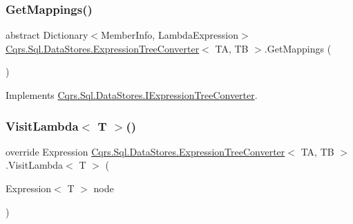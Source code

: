 \subsubsection{\texorpdfstring{Get\+Mappings()}{GetMappings()}}
{\footnotesize\ttfamily abstract Dictionary$<$Member\+Info, Lambda\+Expression$>$ \hyperlink{classCqrs_1_1Sql_1_1DataStores_1_1ExpressionTreeConverter}{Cqrs.\+Sql.\+Data\+Stores.\+Expression\+Tree\+Converter}$<$ TA, TB $>$.Get\+Mappings (\begin{DoxyParamCaption}{ }\end{DoxyParamCaption})\hspace{0.3cm}{\ttfamily [pure virtual]}}



Implements \hyperlink{interfaceCqrs_1_1Sql_1_1DataStores_1_1IExpressionTreeConverter_ad48480ecf7056a2b2cc079006cc2a589_ad48480ecf7056a2b2cc079006cc2a589}{Cqrs.\+Sql.\+Data\+Stores.\+I\+Expression\+Tree\+Converter}.

\mbox{\label{classCqrs_1_1Sql_1_1DataStores_1_1ExpressionTreeConverter_abf97079f29447cd8e0bcfab91891ccb9_abf97079f29447cd8e0bcfab91891ccb9}} 
\subsubsection{\texorpdfstring{Visit\+Lambda$<$ T $>$()}{VisitLambda< T >()}}
{\footnotesize\ttfamily override Expression \hyperlink{classCqrs_1_1Sql_1_1DataStores_1_1ExpressionTreeConverter}{Cqrs.\+Sql.\+Data\+Stores.\+Expression\+Tree\+Converter}$<$ TA, TB $>$.Visit\+Lambda$<$ T $>$ (\begin{DoxyParamCaption}\item[{Expression$<$ T $>$}]{node }\end{DoxyParamCaption})\hspace{0.3cm}{\ttfamily [protected]}}

\mbox{\label{classCqrs_1_1Sql_1_1DataStores_1_1ExpressionTreeConverter_ab6eca1d967e864aee4697f64ea9b23a0_ab6eca1d967e864aee4697f64ea9b23a0}} 
